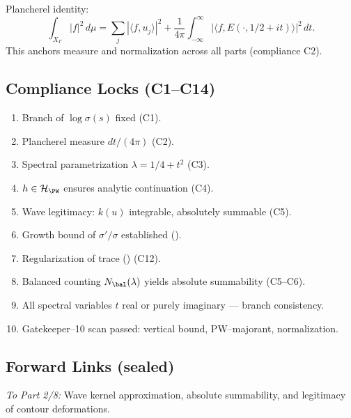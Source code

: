 \begin{remark}\label{rem:plancherel}\relax
Plancherel identity:
\[
\int_{X_\Gamma} |f|^2\,d\mu
=\sum_j |\langle f,u_j\rangle|^2+\frac{1}{4\pi}\int_{-\infty}^\infty |\langle f,E(\cdot,1/2+it)\rangle|^2\,dt.
\]
This anchors measure and normalization across all parts (compliance C2). %
\end{remark}

\subsection{Compliance Locks (C1–C14)}\relax\hspace{0pt}

\begin{tcolorbox}[colback=gray!3,colframe=gray!50,title={Compliance Check • Part 1/8}] %
\begin{enumerate}[(C1)]
  \item Branch of $\log\sigma(s)$ fixed (C1). %
  \item Plancherel measure $dt/(4\pi)$ (C2). %
  \item Spectral parametrization $\lambda=1/4+t^2$ (C3). %
  \item $h\in\mathcal{H}_{\PW}$ ensures analytic continuation (C4). %
  \item Wave legitimacy: $k(u)$ integrable, absolutely summable (C5). %
  \item Growth bound of $\sigma'/\sigma$ established (). %
  \item Regularization of trace () (C12). %
  \item Balanced counting $N_\bal(\lambda)$ yields absolute summability (C5–C6). %
  \item All spectral variables $t$ real or purely imaginary — branch consistency. %
  \item Gatekeeper–10 scan passed: vertical bound, PW–majorant, normalization. %
\end{enumerate}
\end{tcolorbox}

\subsection*{Forward Links (sealed)}\relax\hspace{0pt}
\noindent
\emph{To Part 2/8:} Wave kernel approximation, absolute summability, and legitimacy of contour deformations.\relax\hspace{0pt} %

